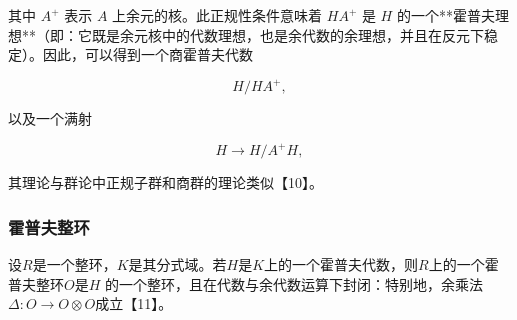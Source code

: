 其中 $A^{+}$ 表示 $A$ 上余元的核。此正规性条件意味着 $H A^{+}$ 是 $H$ 的一个**霍普夫理想**（即：它既是余元核中的代数理想，也是余代数的余理想，并且在反元下稳定）。因此，可以得到一个商霍普夫代数

$$
H / H A^{+},
$$

以及一个满射

$$
H \to H / A^{+} H,
$$

其理论与群论中正规子群和商群的理论类似【10】。
\subsubsection{霍普夫整环}
设$R$是一个整环，$K$是其分式域。若$H$是$K$上的一个霍普夫代数，则$R$上的一个霍普夫整环$O$是$H$ 的一个整环，且在代数与余代数运算下封闭：特别地，余乘法$\Delta : O \to O \otimes O$成立【11】。
